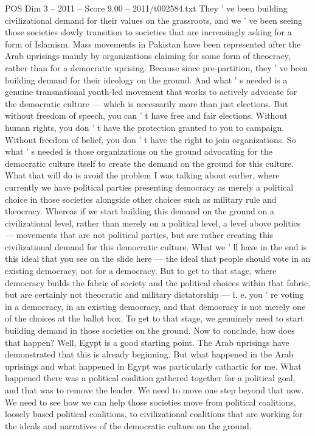 \begin{textsample}{POS Dim 3 – 2011 – Score 9.00 – 2011/t002584.txt}
They ' ve been building civilizational demand for their values on the grassroots, and we ' ve been seeing those societies slowly transition to societies that are increasingly asking for a form of Islamism.
Mass movements in Pakistan have been represented after the Arab uprisings mainly by organizations claiming for some form of theocracy, rather than for a democratic uprising.
Because since pre-partition, they ' ve been building demand for their ideology on the ground.
And what ' s needed is a genuine transnational youth-led movement that works to actively advocate for the democratic culture — which is necessarily more than just elections.
But without freedom of speech, you can ' t have free and fair elections.
Without human rights, you don ' t have the protection granted to you to campaign.
Without freedom of belief, you don ' t have the right to join organizations.
So what ' s needed is those organizations on the ground advocating for the democratic culture itself to create the demand on the ground for this culture.
What that will do is avoid the problem I was talking about earlier, where currently we have political parties presenting democracy as merely a political choice in those societies alongside other choices such as military rule and theocracy.
Whereas if we start building this demand on the ground on a civilizational level, rather than merely on a political level, a level above politics — movements that are not political parties, but are rather creating this civilizational demand for this democratic culture.
What we ' ll have in the end is this ideal that you see on the slide here — the ideal that people should vote in an existing democracy, not for a democracy.
But to get to that stage, where democracy builds the fabric of society and the political choices within that fabric, but are certainly not theocratic and military dictatorship — i. e. you ' re voting in a democracy, in an existing democracy, and that democracy is not merely one of the choices at the ballot box.
To get to that stage, we genuinely need to start building demand in those societies on the ground.
Now to conclude, how does that happen?
Well, Egypt is a good starting point.
The Arab uprisings have demonstrated that this is already beginning.
But what happened in the Arab uprisings and what happened in Egypt was particularly cathartic for me.
What happened there was a political coalition gathered together for a political goal, and that was to remove the leader.
We need to move one step beyond that now.
We need to see how we can help those societies move from political coalitions, loosely based political coalitions, to civilizational coalitions that are working for the ideals and narratives of the democratic culture on the ground.

\end{textsample}
